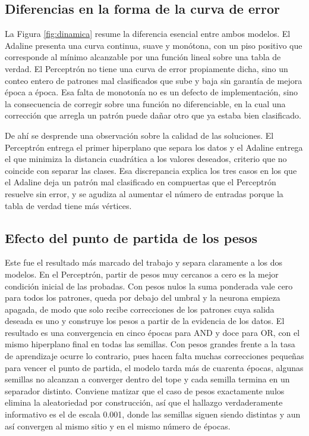 \documentclass[11pt,letterpaper]{article}
\begin{document}
\subsection{Diferencias en la forma de la curva de error}

La Figura \ref{fig:dinamica} resume la diferencia esencial entre ambos modelos. El Adaline presenta una curva continua, suave y monótona, con un piso positivo que corresponde al mínimo alcanzable por una función lineal sobre una tabla de verdad. El Perceptrón no tiene una curva de error propiamente dicha, sino un conteo entero de patrones mal clasificados que sube y baja sin garantía de mejora época a época. Esa falta de monotonía no es un defecto de implementación, sino la consecuencia de corregir sobre una función no diferenciable, en la cual una corrección que arregla un patrón puede dañar otro que ya estaba bien clasificado.

De ahí se desprende una observación sobre la calidad de las soluciones. El Perceptrón entrega el primer hiperplano que separa los datos y el Adaline entrega el que minimiza la distancia cuadrática a los valores deseados, criterio que no coincide con separar las clases. Esa discrepancia explica los tres casos en los que el Adaline deja un patrón mal clasificado en compuertas que el Perceptrón resuelve sin error, y se agudiza al aumentar el número de entradas porque la tabla de verdad tiene más vértices.

\subsection{Efecto del punto de partida de los pesos}

Este fue el resultado más marcado del trabajo y separa claramente a los dos modelos. En el Perceptrón, partir de pesos muy cercanos a cero es la mejor condición inicial de las probadas. Con pesos nulos la suma ponderada vale cero para todos los patrones, queda por debajo del umbral y la neurona empieza apagada, de modo que solo recibe correcciones de los patrones cuya salida deseada es uno y construye los pesos a partir de la evidencia de los datos. El resultado es una convergencia en cinco épocas para AND y doce para OR, con el mismo hiperplano final en todas las semillas. Con pesos grandes frente a la tasa de aprendizaje ocurre lo contrario, pues hacen falta muchas correcciones pequeñas para vencer el punto de partida, el modelo tarda más de cuarenta épocas, algunas semillas no alcanzan a converger dentro del tope y cada semilla termina en un separador distinto. Conviene matizar que el caso de pesos exactamente nulos elimina la aleatoriedad por construcción, así que el hallazgo verdaderamente informativo es el de escala 0.001, donde las semillas siguen siendo distintas y aun así convergen al mismo sitio y en el mismo número de épocas.
\end{document}
